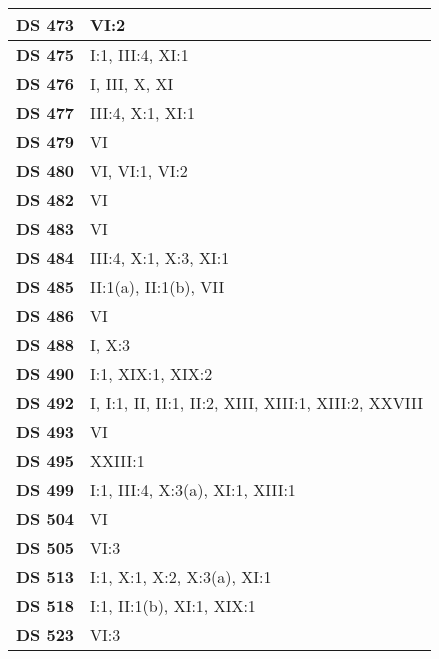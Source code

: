 \begin{xltabular}{\linewidth}{ l | X }
    \textbf {DS 473} & VI:2 \\ \hline

    \textbf {DS 475} & I:1, III:4, XI:1 \\ \hline

    \textbf {DS 476} & I, III, X, XI \\ \hline

    \textbf {DS 477} & III:4, X:1, XI:1 \\ \hline

    \textbf {DS 479} & VI \\ \hline

    \textbf {DS 480} & VI, VI:1, VI:2 \\ \hline

    \textbf {DS 482} & VI \\ \hline

    \textbf {DS 483} & VI \\ \hline

    \textbf {DS 484} & III:4, X:1, X:3, XI:1 \\ \hline

    \textbf {DS 485} & II:1(a), II:1(b), VII \\ \hline

    \textbf {DS 486} & VI \\ \hline

    \textbf {DS 488} & I, X:3 \\ \hline

    \textbf {DS 490} & I:1, XIX:1, XIX:2 \\ \hline

    \textbf {DS 492} & I, I:1, II, II:1, II:2, XIII, XIII:1, XIII:2, XXVIII \\ \hline

    \textbf {DS 493} & VI \\ \hline

    \textbf {DS 495} & XXIII:1 \\ \hline

    \textbf {DS 499} & I:1, III:4, X:3(a), XI:1, XIII:1 \\ \hline

    \textbf {DS 504} & VI \\ \hline

    \textbf {DS 505} & VI:3 \\ \hline

    \textbf {DS 513} & I:1, X:1, X:2, X:3(a), XI:1 \\ \hline

    \textbf {DS 518} & I:1, II:1(b), XI:1, XIX:1 \\ \hline

    \textbf {DS 523} & VI:3 \\ \hline

    \hline
\end{xltabular}